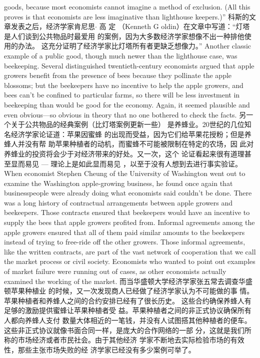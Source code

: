 \begin{paracol}{2}
goods, because most economists cannot imagine a method of
exclusion. (All this proves is that economists are less imaginative than lighthouse keepers.)''
\switchcolumn
科斯的文章发表之后，经济学家肯尼思$\cdot$ 高 定 （Kenneth
G oldin）在文章中写道：“灯塔是人们谈到公共物品时最爱用
的案例，因为大多数经济学家想像不出一种排他使用的办法。
这充分证明了经济学家比灯塔所有者更缺乏想像力。”
\switchcolumn*
Another classic example of a public good, though much
newer than the lighthouse case, was beekeeping. Several distinguished twentieth-century economists argued that apple growers benefit from the presence of bees because they pollinate the
apple blossoms; but the beekeepers have no incentive to help
the apple growers, and bees can't be confined to particular
farms, so there will be less investment in beekeeping than
would be good for the economy. Again, it seemed plausible and
even obvious---so obvious in theory that no one bothered to
check the facts.
\switchcolumn
另一个关于公共物品的经典案例（比灯塔案例更新一些）
是养蜂业。20世纪的几位知名经济学家论证道：苹果因蜜蜂
的出现而受益，因为它们给苹果花授粉；但是养蜂人并没有帮
助苹果种植者的动机，而蜜蜂不可能被限制在特定的农场，因
此对养蜂业的投资将会少于对经济带来的好处。又一次，这个
论证看起来很有道理甚至显而易见 --- 理论上是如此显而易见 ，以至于没有人想到去进行事实验证。
\switchcolumn*
When economist Stephen Cheung of the University of
Washington went out to examine the Washington apple-growing business, he found once again that businesspeople were already doing what economists said couldn't be done. There was a long history of contractual arrangements between apple
growers and beekeepers. Those contracts ensured that beekeepers would have an incentive to supply the bees that apple growers profited from. Informal agreements among the apple
growers ensured that all of them paid similar amounts to the
beekeepers instead of trying to free-ride off the other growers.
Those informal agreements, like the written contracts, are part
of the vast network of cooperation that we call the market
process or civil society. Economists who wanted to point out examples of market failure were running out of cases, as other
economists actually examined the working of the market.
\switchcolumn
而当华盛顿大学经济学家张五常去调查华盛顿苹果种植业
的时候，又一次发现商人已经做了经济学家认为不可能做的事
情。苹果种植者和养蜂人之间的合约安排已经有了很长历史。
这些合约确保养蜂人有足够的激励提供蜜蜂让苹果种植者受
益。苹果种植者之间的非正式协议确保所有人都向养蜂人支付
数量大体相近的一笔钱，并没有人试图搭其他种植者的便车。
这些非正式协议就像书面合同一样，是庞大的合作网络的一部
分，这就是我们所称的市场经济或者市民社会。由于其他经济
学家不断地去实际检验市场的有效性，那些主张市场失败的经
济学家已经没有多少案例可举了。


\end{paracol}
